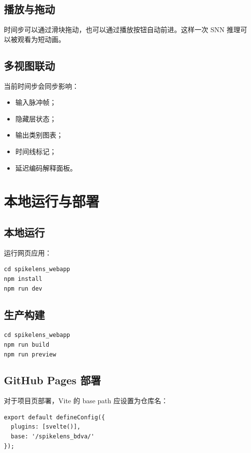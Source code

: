 \documentclass[UTF8,11pt,a4paper]{ctexart}
\begin{document}
\subsection{播放与拖动}

时间步可以通过滑块拖动，也可以通过播放按钮自动前进。这样一次 SNN 推理可以被观看为短动画。

\subsection{多视图联动}

当前时间步会同步影响：

\begin{itemize}
    \item 输入脉冲帧；
    \item 隐藏层状态；
    \item 输出类别图表；
    \item 时间线标记；
    \item 延迟编码解释面板。
\end{itemize}

\section{本地运行与部署}

\subsection{本地运行}

运行网页应用：

\begin{lstlisting}
cd spikelens_webapp
npm install
npm run dev
\end{lstlisting}

\subsection{生产构建}

\begin{lstlisting}
cd spikelens_webapp
npm run build
npm run preview
\end{lstlisting}

\subsection{GitHub Pages 部署}

对于项目页部署，Vite 的 base path 应设置为仓库名：

\begin{lstlisting}
export default defineConfig({
  plugins: [svelte()],
  base: '/spikelens_bdva/'
});
\end{lstlisting}
\end{document}
